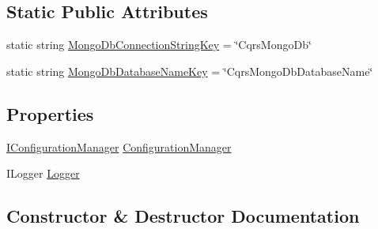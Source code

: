 \subsection*{Static Public Attributes}
\begin{DoxyCompactItemize}
\item 
static string \hyperlink{classCqrs_1_1MongoDB_1_1Factories_1_1MongoDbDataStoreConnectionStringFactory_af6b4a1e2a8dfaa3989ec3c6d0f0803e1_af6b4a1e2a8dfaa3989ec3c6d0f0803e1}{Mongo\+Db\+Connection\+String\+Key} = \char`\"{}Cqrs\+Mongo\+Db\char`\"{}
\item 
static string \hyperlink{classCqrs_1_1MongoDB_1_1Factories_1_1MongoDbDataStoreConnectionStringFactory_ae0a5d15a403e61d3ce71a8cdabe01525_ae0a5d15a403e61d3ce71a8cdabe01525}{Mongo\+Db\+Database\+Name\+Key} = \char`\"{}Cqrs\+Mongo\+Db\+Database\+Name\char`\"{}
\end{DoxyCompactItemize}
\subsection*{Properties}
\begin{DoxyCompactItemize}
\item 
\hyperlink{interfaceCqrs_1_1Configuration_1_1IConfigurationManager}{I\+Configuration\+Manager} \hyperlink{classCqrs_1_1MongoDB_1_1Factories_1_1MongoDbDataStoreConnectionStringFactory_af39bf5809bdffc1499a995ac1769831a_af39bf5809bdffc1499a995ac1769831a}{Configuration\+Manager}
\item 
I\+Logger \hyperlink{classCqrs_1_1MongoDB_1_1Factories_1_1MongoDbDataStoreConnectionStringFactory_ab2ebea030cc01719042d338712224f50_ab2ebea030cc01719042d338712224f50}{Logger}
\end{DoxyCompactItemize}


\subsection{Constructor \& Destructor Documentation}
\mbox{\label{classCqrs_1_1MongoDB_1_1Factories_1_1MongoDbDataStoreConnectionStringFactory_a9ccb753772ee1aa374ad39ba5b93700f_a9ccb753772ee1aa374ad39ba5b93700f}} 
